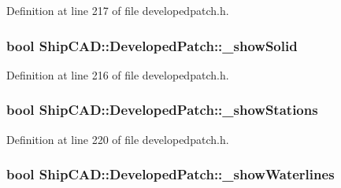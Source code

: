 Definition at line 217 of file developedpatch.\+h.

\subsubsection[{\texorpdfstring{\+\_\+show\+Solid}{_showSolid}}]{\setlength{\rightskip}{0pt plus 5cm}bool Ship\+C\+A\+D\+::\+Developed\+Patch\+::\+\_\+show\+Solid\hspace{0.3cm}{\ttfamily [protected]}}\hypertarget{classShipCAD_1_1DevelopedPatch_af60d915295602a7d973f4accfe6f1074}{}\label{classShipCAD_1_1DevelopedPatch_af60d915295602a7d973f4accfe6f1074}


Definition at line 216 of file developedpatch.\+h.

\subsubsection[{\texorpdfstring{\+\_\+show\+Stations}{_showStations}}]{\setlength{\rightskip}{0pt plus 5cm}bool Ship\+C\+A\+D\+::\+Developed\+Patch\+::\+\_\+show\+Stations\hspace{0.3cm}{\ttfamily [protected]}}\hypertarget{classShipCAD_1_1DevelopedPatch_ab970c1f908562c329577a568aa011268}{}\label{classShipCAD_1_1DevelopedPatch_ab970c1f908562c329577a568aa011268}


Definition at line 220 of file developedpatch.\+h.

\subsubsection[{\texorpdfstring{\+\_\+show\+Waterlines}{_showWaterlines}}]{\setlength{\rightskip}{0pt plus 5cm}bool Ship\+C\+A\+D\+::\+Developed\+Patch\+::\+\_\+show\+Waterlines\hspace{0.3cm}{\ttfamily [protected]}}\hypertarget{classShipCAD_1_1DevelopedPatch_a876f5a294f194b79112c224ed66db35d}{}\label{classShipCAD_1_1DevelopedPatch_a876f5a294f194b79112c224ed66db35d}


